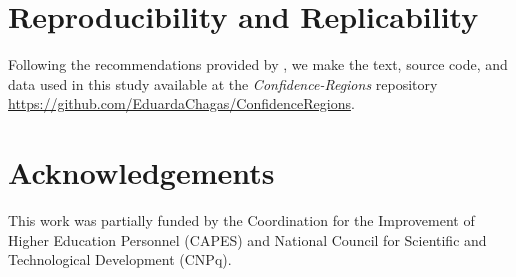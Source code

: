\documentclass[alpha-refs]{wiley-article}
\begin{document}
\section{Reproducibility and Replicability}\label{Sec:code}

Following the recommendations provided by \cite{ABadgingSystemforReproducibilityandReplicabilityinRemoteSensingResearch}, we make the text, source code, and data used in this study available at the \textit{Confidence-Regions} repository \url{https://github.com/EduardaChagas/ConfidenceRegions}.

\section{Acknowledgements}\label{Sec:acknowledgements}

This work was partially funded by the Coordination for the Improvement of Higher Education Personnel (CAPES) and National Council for Scientific and Technological Development (CNPq).

\printendnotes


\end{document}
